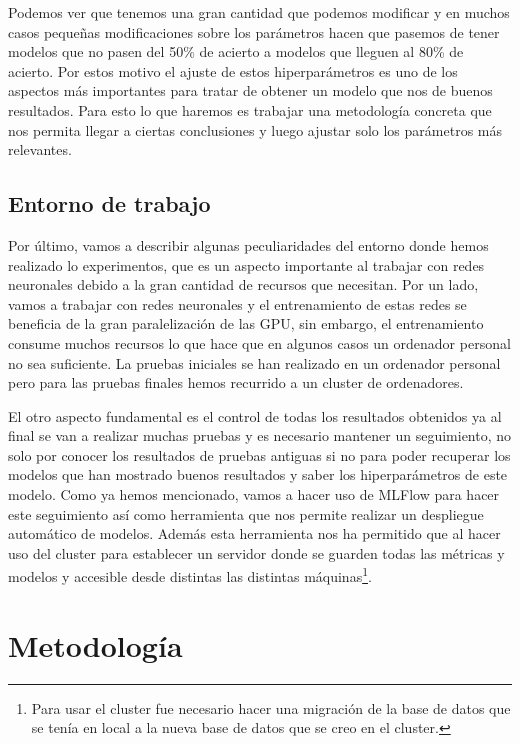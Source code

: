 \documentclass[a4paper,12pt,twoside,titlepage]{article}
\begin{document}
Podemos ver que tenemos una gran cantidad que podemos modificar y en muchos casos pequeñas modificaciones sobre los parámetros hacen que pasemos de tener modelos que no pasen del 50\% de acierto a modelos que lleguen al 80\% de acierto. Por estos motivo el ajuste de estos hiperparámetros es uno de los aspectos más importantes para tratar de obtener un modelo que nos de buenos resultados. Para esto lo que haremos es trabajar una metodología concreta que nos permita llegar a ciertas conclusiones y luego ajustar solo los parámetros más relevantes.

\subsection{Entorno de trabajo}

Por último, vamos a describir algunas peculiaridades del entorno donde hemos realizado lo experimentos, que es un aspecto importante al trabajar con redes neuronales debido a la gran cantidad de recursos que necesitan. Por un lado, vamos a trabajar con redes neuronales y el entrenamiento de estas redes se beneficia de la gran paralelización de las GPU, sin embargo, el entrenamiento consume muchos recursos lo que hace que en algunos casos un ordenador personal no sea suficiente. La pruebas iniciales se han realizado en un ordenador personal pero para las pruebas finales hemos recurrido a un cluster de ordenadores. 

El otro aspecto fundamental es el control de todas los resultados obtenidos ya al final se van a realizar muchas pruebas y es necesario mantener un seguimiento, no solo por conocer los resultados de pruebas antiguas si no para poder recuperar los modelos que han mostrado buenos resultados y saber los hiperparámetros de este modelo. Como ya hemos mencionado, vamos a hacer uso de MLFlow para hacer este seguimiento así como herramienta que nos permite realizar un despliegue automático de modelos. Además esta herramienta nos ha permitido que al hacer uso del cluster para establecer un servidor donde se guarden todas las métricas y modelos y accesible desde distintas las distintas máquinas\footnote{Para usar el cluster fue necesario hacer una migración de la base de datos que se tenía en local a la nueva base de datos que se creo en el cluster.}. 

\section{Metodología}
\end{document}
